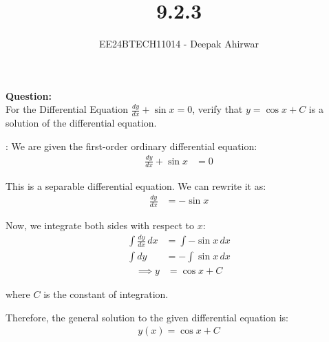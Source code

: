 \documentclass[journal]{IEEEtran}
\begin{document}

\vspace{3cm}

\title{9.2.3}
\author{EE24BTECH11014 - Deepak Ahirwar}

{\let\newpage\relax\maketitle}

\renewcommand{\thefigure}{\theenumi}
\renewcommand{\thetable}{\theenumi}
\setlength{\intextsep}{10pt} %

\textbf{Question:}\\
For the Differential Equation $\frac{dy}{dx}+ \sin{x}=0$, verify that $y = \cos{x}+C$ is a solution of the differential equation.

\solution:
We are given the first-order ordinary differential equation:
\begin{align}
\frac{dy}{dx} + \sin x &= 0
\end{align}

This is a separable differential equation. We can rewrite it as:
\begin{align}
\frac{dy}{dx} &= -\sin x
\end{align}

Now, we integrate both sides with respect to $x$:
\begin{align}
\int \frac{dy}{dx} \, dx &= \int -\sin x \, dx \\
\int dy &= -\int \sin x \, dx
\end{align}
\begin{align}
 \implies y &= \cos x + C
\end{align}

where $C$ is the constant of integration.

Therefore, the general solution to the given differential equation is:
\begin{align}
y(x) = \cos x + C
\end{align}
\end{document}
